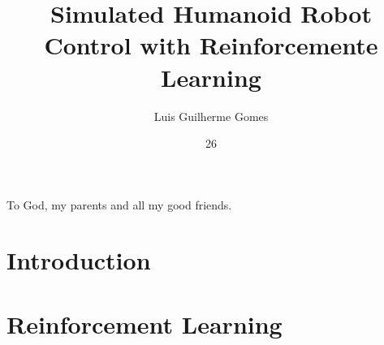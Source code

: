 \documentclass[tg, eng]{ita}    %
\author{Luis Guilherme Gomes}{Aguiar}
\title{Simulated Humanoid Robot Control with Reinforcemente Learning}
\date{26}{Junho}{2018}
\begin{document}
\maketitle

\begin{itadedication}
To God, my parents and all my good friends.
\end{itadedication}

\begin{itathanks}

\end{itathanks}


\begin{abstract}
\noindent

\end{abstract}

\begin{englishabstract}
\noindent

\end{englishabstract}

\listoffigures %


\listofabbreviations

\listofsymbols

\tableofcontents

\mainmatter

\chapter{Introduction}
\label{chap:introduction}


\chapter{Reinforcement Learning}
\label{chap:rl}

\end{document}
